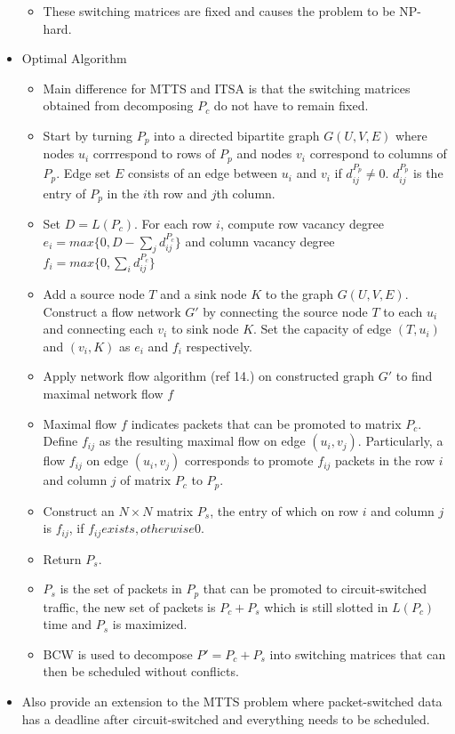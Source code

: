 \documentclass{article}
\begin{document}
\begin{itemize}
\begin{itemize}
        \item These switching matrices are fixed and causes the problem to be NP-hard.
    \end{itemize}
    \item Optimal Algorithm
    \begin{itemize}
        \item Main difference for MTTS and ITSA is that the switching matrices obtained from decomposing $P_c$ do not have to remain fixed.
        \item Start by turning $P_p$ into a directed bipartite graph $G(U,V,E)$ where nodes $u_i$ corrrespond to rows of $P_p$ and nodes $v_i$ correspond to columns of $P_p$.  Edge set $E$ consists of an edge between $u_i$ and $v_i$ if $d_{ij}^{P_p} \neq 0$. $d_{ij}^{P_p}$ is the entry of $P_p$ in the $i$th row and $j$th column.
        \item Set $D=L(P_c)$.  For each row $i$, compute row vacancy degree $e_i=max\{0, D-\sum_j d_{ij}^{P_c}\}$ and column vacancy degree $f_i = max\{0, \sum_i d_{ij}^{P_c}\}$
        \item Add a source node $T$ and a sink node $K$ to the graph $G(U,V,E)$.  Construct a flow network $G'$ by connecting the source node $T$ to each $u_i$ and connecting each $v_i$ to sink node $K$.  Set the capacity of edge $(T,u_i)$ and $(v_i,K)$ as $e_i$ and $f_i$ respectively.
        \item Apply network flow algorithm (ref 14.) on constructed graph $G'$ to find maximal network flow $f$
        \item Maximal flow $f$ indicates packets that can be promoted to matrix $P_c$. Define $f_{ij}$ as the resulting maximal flow on edge $(u_i, v_j)$.  Particularly, a flow $f_{ij}$ on edge $(u_i, v_j)$ corresponds to promote $f_{ij}$ packets in the row $i$ and column $j$ of matrix $P_c$ to $P_p$.
        \item Construct an $N \times N$ matrix $P_s$, the entry of which on row $i$ and column $j$ is $f_{ij}$, if $f_{ij} exists, otherwise 0$.
        \item Return $P_s$.
        \item $P_s$ is the set of packets in $P_p$ that can be promoted to circuit-switched traffic, the new set of packets is $P_c + P_s$ which is still slotted in $L(P_c)$ time and $P_s$ is maximized.
        \item BCW is used to decompose $P' = P_c + P_s$ into switching matrices that can then be scheduled without conflicts.
    \end{itemize}
    \item Also provide an extension to the MTTS problem where packet-switched data has a deadline after circuit-switched and everything needs to be scheduled.
\end{itemize}
\end{document}
